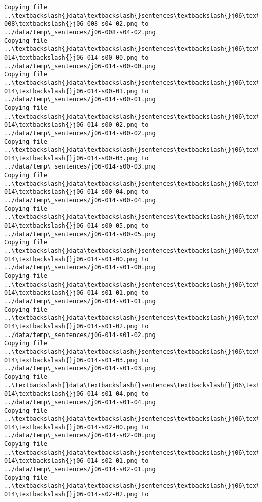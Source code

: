 \documentclass[11pt]{article}
\begin{document}
\begin{Verbatim}[commandchars=\\\{\}]
Copying file ..\textbackslash{}data\textbackslash{}sentences\textbackslash{}j06\textbackslash{}j06-008\textbackslash{}j06-008-s04-02.png to
../data/temp\_sentences/j06-008-s04-02.png
Copying file ..\textbackslash{}data\textbackslash{}sentences\textbackslash{}j06\textbackslash{}j06-014\textbackslash{}j06-014-s00-00.png to
../data/temp\_sentences/j06-014-s00-00.png
Copying file ..\textbackslash{}data\textbackslash{}sentences\textbackslash{}j06\textbackslash{}j06-014\textbackslash{}j06-014-s00-01.png to
../data/temp\_sentences/j06-014-s00-01.png
Copying file ..\textbackslash{}data\textbackslash{}sentences\textbackslash{}j06\textbackslash{}j06-014\textbackslash{}j06-014-s00-02.png to
../data/temp\_sentences/j06-014-s00-02.png
Copying file ..\textbackslash{}data\textbackslash{}sentences\textbackslash{}j06\textbackslash{}j06-014\textbackslash{}j06-014-s00-03.png to
../data/temp\_sentences/j06-014-s00-03.png
Copying file ..\textbackslash{}data\textbackslash{}sentences\textbackslash{}j06\textbackslash{}j06-014\textbackslash{}j06-014-s00-04.png to
../data/temp\_sentences/j06-014-s00-04.png
Copying file ..\textbackslash{}data\textbackslash{}sentences\textbackslash{}j06\textbackslash{}j06-014\textbackslash{}j06-014-s00-05.png to
../data/temp\_sentences/j06-014-s00-05.png
Copying file ..\textbackslash{}data\textbackslash{}sentences\textbackslash{}j06\textbackslash{}j06-014\textbackslash{}j06-014-s01-00.png to
../data/temp\_sentences/j06-014-s01-00.png
Copying file ..\textbackslash{}data\textbackslash{}sentences\textbackslash{}j06\textbackslash{}j06-014\textbackslash{}j06-014-s01-01.png to
../data/temp\_sentences/j06-014-s01-01.png
Copying file ..\textbackslash{}data\textbackslash{}sentences\textbackslash{}j06\textbackslash{}j06-014\textbackslash{}j06-014-s01-02.png to
../data/temp\_sentences/j06-014-s01-02.png
Copying file ..\textbackslash{}data\textbackslash{}sentences\textbackslash{}j06\textbackslash{}j06-014\textbackslash{}j06-014-s01-03.png to
../data/temp\_sentences/j06-014-s01-03.png
Copying file ..\textbackslash{}data\textbackslash{}sentences\textbackslash{}j06\textbackslash{}j06-014\textbackslash{}j06-014-s01-04.png to
../data/temp\_sentences/j06-014-s01-04.png
Copying file ..\textbackslash{}data\textbackslash{}sentences\textbackslash{}j06\textbackslash{}j06-014\textbackslash{}j06-014-s02-00.png to
../data/temp\_sentences/j06-014-s02-00.png
Copying file ..\textbackslash{}data\textbackslash{}sentences\textbackslash{}j06\textbackslash{}j06-014\textbackslash{}j06-014-s02-01.png to
../data/temp\_sentences/j06-014-s02-01.png
Copying file ..\textbackslash{}data\textbackslash{}sentences\textbackslash{}j06\textbackslash{}j06-014\textbackslash{}j06-014-s02-02.png to

\end{Verbatim}
\end{document}
